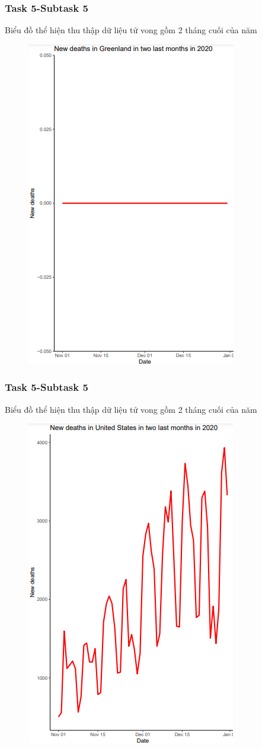 \documentclass[english,10pt,table]{beamer}
\begin{document}
\frame
{
    \frametitle{Task 5-Subtask 5}
    \begin{block}{Biểu đồ thể hiện thu thập dữ liệu tử vong gồm 2 tháng cuối của năm}
    \begin{figure}[H]
		\centering
		\includegraphics[scale=0.5]{images/5.5.2.png}
	\end{figure}
    \end{block}
}
\frame
{
    \frametitle{Task 5-Subtask 5}
    \begin{block}{Biểu đồ thể hiện thu thập dữ liệu tử vong gồm 2 tháng cuối của năm}
    \begin{figure}[H]
		\centering
		\includegraphics[scale=0.5]{images/5.5.3.png}
	\end{figure}
    \end{block}
}
\end{document}
